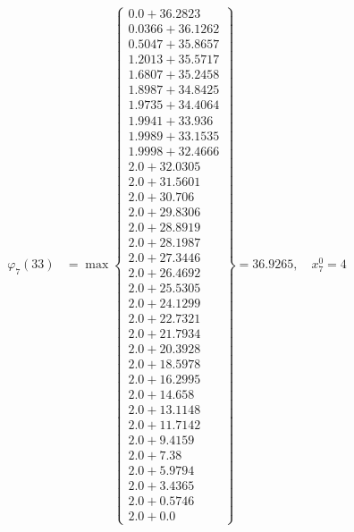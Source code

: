 \documentclass{article}
\begin{document}
\begin{align*}
\varphi_{7}(33) &= \max \left\{ \begin{array}{c}
0.0 + 36.2823 \\
 0.0366 + 36.1262 \\
 0.5047 + 35.8657 \\
 1.2013 + 35.5717 \\
 1.6807 + 35.2458 \\
 1.8987 + 34.8425 \\
 1.9735 + 34.4064 \\
 1.9941 + 33.936 \\
 1.9989 + 33.1535 \\
 1.9998 + 32.4666 \\
 2.0 + 32.0305 \\
 2.0 + 31.5601 \\
 2.0 + 30.706 \\
 2.0 + 29.8306 \\
 2.0 + 28.8919 \\
 2.0 + 28.1987 \\
 2.0 + 27.3446 \\
 2.0 + 26.4692 \\
 2.0 + 25.5305 \\
 2.0 + 24.1299 \\
 2.0 + 22.7321 \\
 2.0 + 21.7934 \\
 2.0 + 20.3928 \\
 2.0 + 18.5978 \\
 2.0 + 16.2995 \\
 2.0 + 14.658 \\
 2.0 + 13.1148 \\
 2.0 + 11.7142 \\
 2.0 + 9.4159 \\
 2.0 + 7.38 \\
 2.0 + 5.9794 \\
 2.0 + 3.4365 \\
 2.0 + 0.5746 \\
 2.0 + 0.0
\end{array} \right\}=36.9265, \quad x_{7}^0=4\\
  

\end{align*}
\end{document}
